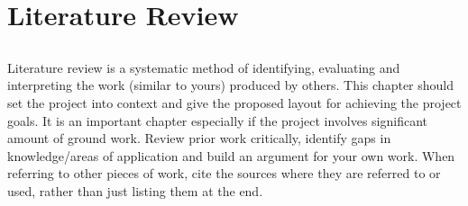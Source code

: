 \chapter{Literature Review} \label{chap:literatureReview}


\section*{}
Literature review is a systematic method of identifying, evaluating and interpreting the work (similar to yours) produced by others. This chapter should set the project into context and give the proposed layout for achieving the project goals. It is an important chapter especially if the project involves significant amount of ground work. Review prior work critically, identify gaps in knowledge/areas of application and build an argument for your own work. When referring to other pieces of work, cite the sources where they are referred to or used, rather than just listing them at the end. 

